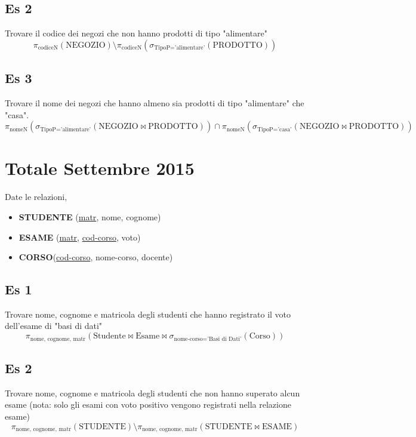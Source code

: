 \subsection{Es 2}
Trovare il codice dei negozi che non hanno prodotti di tipo "alimentare"
$$\displaystyle \pi_{\text{codiceN}}(\text{NEGOZIO}) \setminus \pi_{\text{codiceN}}(\sigma_{\text{TipoP} = \text{'alimentare'}}(\text{PRODOTTO}))$$

\subsection{Es 3}
Trovare il nome dei negozi che hanno almeno sia prodotti di tipo "alimentare" che "casa".
$$\displaystyle \pi_{\text{nomeN}} ( \sigma_{\text{TipoP} = \text{'alimentare'}} ( \text{NEGOZIO} \bowtie \text{PRODOTTO} ) ) \cap \pi_{\text{nomeN}} ( \sigma_{\text{TipoP} = \text{'casa'}} ( \text{NEGOZIO} \bowtie \text{PRODOTTO} ) )$$

\newpage
\section{Totale Settembre 2015}

Date le relazioni,

\begin{center}
    \begin{itemize}
        \item \textbf{STUDENTE} (\underline{matr}, nome, cognome) \\
        \item \textbf{ESAME} (\underline{matr}, \underline{cod-corso}, voto) \\
        \item \textbf{CORSO}(\underline{cod-corso}, nome-corso, docente)
    \end{itemize}
\end{center}

\subsection{Es 1}
Trovare nome, cognome e matricola degli studenti che hanno registrato il voto dell'esame di "basi di dati"
$$\displaystyle \pi_{\text{nome, cognome, matr}} \left( \text{Studente} \bowtie \text{Esame} \bowtie \sigma_{\text{nome-corso} = \text{'Basi di Dati'}} \left( \text{Corso} \right) \right)$$

\subsection{Es 2}
Trovare nome, cognome e matricola degli studenti che non hanno superato alcun esame (nota: solo gli esami con voto positivo vengono registrati nella relazione esame)
$$ \displaystyle \pi_{\text{nome, cognome, matr}}(\text{STUDENTE}) \setminus \pi_{\text{nome, cognome, matr}}(\text{STUDENTE} \bowtie \text{ESAME}) $$

